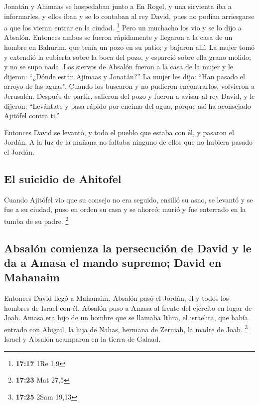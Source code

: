  Jonatán y Ahimaas se hospedaban junto a En Rogel, y una
sirvienta iba a informarles, y ellos iban y se lo contaban al rey David,
pues no podían arriesgarse a que los vieran entrar en la ciudad.
\footnote{\textbf{17:17} 1Re 1,9}  Pero un muchacho los
vio y se lo dijo a Absalón. Entonces ambos se fueron rápidamente y
llegaron a la casa de un hombre en Bahurim, que tenía un pozo en su
patio; y bajaron allí.  La mujer tomó y extendió la
cubierta sobre la boca del pozo, y esparció sobre ella grano molido; y
no se supo nada.  Los siervos de Absalón fueron a la casa
de la mujer y le dijeron: ``¿Dónde están Ajimaas y Jonatán?'' La mujer
les dijo: ``Han pasado el arroyo de las aguas''. Cuando los buscaron y
no pudieron encontrarlos, volvieron a Jerusalén.  Después
de partir, salieron del pozo y fueron a avisar al rey David, y le
dijeron: ``Levántate y pasa rápido por encima del agua, porque así ha
aconsejado Ajitófel contra ti.''

 Entonces David se levantó, y todo el pueblo que estaba
con él, y pasaron el Jordán. A la luz de la mañana no faltaba ninguno de
ellos que no hubiera pasado el Jordán.

\hypertarget{el-suicidio-de-ahitofel}{%
\subsection{El suicidio de Ahitofel}\label{el-suicidio-de-ahitofel}}

 Cuando Ajitófel vio que su consejo no era seguido,
ensilló su asno, se levantó y se fue a su ciudad, puso en orden su casa
y se ahorcó; murió y fue enterrado en la tumba de su padre. \footnote{\textbf{17:23}
  Mat 27,5}

\hypertarget{absaluxf3n-comienza-la-persecuciuxf3n-de-david-y-le-da-a-amasa-el-mando-supremo-david-en-mahanaim}{%
\subsection{Absalón comienza la persecución de David y le da a Amasa el
mando supremo; David en
Mahanaim}\label{absaluxf3n-comienza-la-persecuciuxf3n-de-david-y-le-da-a-amasa-el-mando-supremo-david-en-mahanaim}}

 Entonces David llegó a Mahanaim. Absalón pasó el Jordán,
él y todos los hombres de Israel con él.  Absalón puso a
Amasa al frente del ejército en lugar de Joab. Amasa era hijo de un
hombre que se llamaba Ithra, el israelita, que había entrado con
Abigail, la hija de Nahas, hermana de Zeruiah, la madre de Joab.
\footnote{\textbf{17:25} 2Sam 19,13}  Israel y Absalón
acamparon en la tierra de Galaad.

